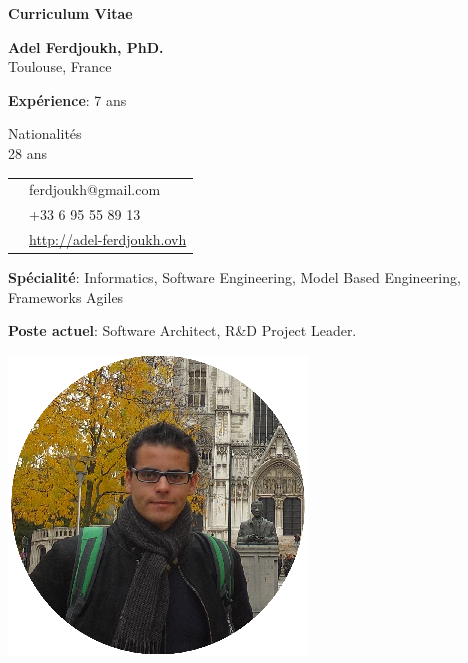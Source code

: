 \thispagestyle{empty}

\renewcommand\refname{~}

\begin{center}
\par\textbf{\huge Curriculum Vitae}
\end{center}

\vspace{.5cm}

\begin{minipage}{0.45\textwidth}
\textbf{Adel Ferdjoukh, PhD.} \\ 
Toulouse, France

\vspace{.3cm}

{\bf Expérience}: 7 ans

\medskip

Nationalités \fr{} \dz{} \kab{} \\
28 ans \\

\begin{tabular}{cl}
\email{} & ferdjoukh@gmail.com\\

\phone{} & +33 6 95 55 89 13\\

\web{} & \url{http://adel-ferdjoukh.ovh}\\
\end{tabular}

\medskip
{\bf Spécialité}: Informatics, Software Engineering, Model Based Engineering, Frameworks Agiles

\medskip
{\bf Poste actuel}: Software Architect, R\&D Project Leader.


\end{minipage}
\hfill
\begin{minipage}{0.45\textwidth}
\begin{flushright}
\includegraphics[scale=0.25]{img/me2.png}~~~~~~~~
\end{flushright}
\end{minipage}


\tair

\sectionline{}
